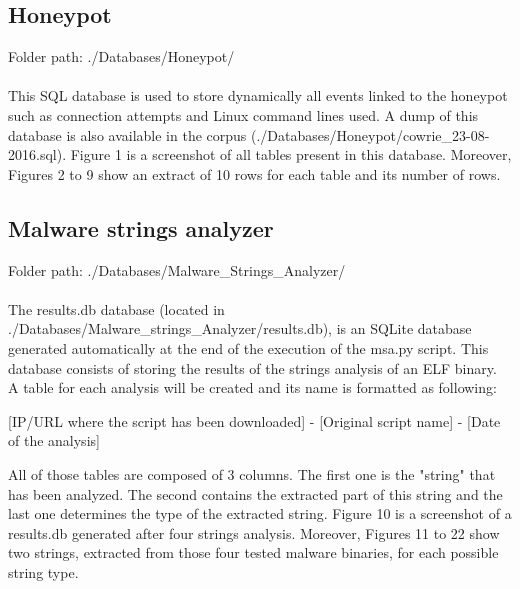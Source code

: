 \subsection{Honeypot}

Folder path: ./Databases/Honeypot/

\paragraph{}
This SQL database is used to store dynamically all events linked to the honeypot such as
connection attempts and Linux command lines used. A dump of this database is also available
in the corpus (./Databases/Honeypot/cowrie\_23-08-2016.sql).
Figure 1 is a screenshot of all tables present in this database. Moreover, Figures 2 to 9
show an extract of 10 rows for each table and its number of rows.





\subsection{Malware strings analyzer}

Folder path: ./Databases/Malware\_Strings\_Analyzer/

\paragraph{}
The results.db database (located in ./Databases/Malware\_strings\_Analyzer/results.db), is an SQLite database
generated automatically at the end of the execution of the msa.py script. This database
consists of storing the results of the strings analysis of an ELF binary. A table for each
analysis will be created and its name is formatted as following:
\begin{center}
[IP/URL where the script has been downloaded] - [Original script name] - [Date of the analysis]
\end{center}
All of those tables are composed of 3 columns. The first one is the "string" that
has been analyzed. The second contains the extracted part of this string and the last one
determines the type of the extracted string.
Figure 10 is a screenshot of a results.db generated after four strings analysis.
Moreover, Figures 11 to 22 show two strings, extracted from those four tested malware binaries,
for each possible string type.

